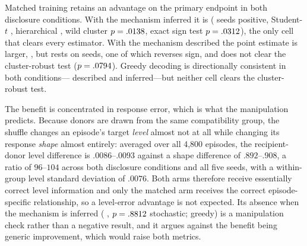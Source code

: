\begin{table}[htbp]
\centering\footnotesize
\setlength{\tabcolsep}{3pt}

\caption{\textbf{Matched training retains a smaller advantage over a
distribution-matched shuffled-target control.} Entries are shuffled-minus-matched
response MAE at \eShufG{} training seeds; positive favors matched training.
The hierarchical interval resamples seeds and trajectories; Webb $p$ is a
two-sided wild cluster bootstrap. The stochastic inferred-mechanism cell is the
pre-registered primary endpoint and the only cell clearing every estimator.}
\label{tab:exp3-shuffled-control}
\end{table}

Matched training retains an advantage on the primary endpoint in both
disclosure conditions. With the mechanism inferred it is
\eShufUndiscStochEst{} (\eShufUndiscStochSign{} seeds positive, Student-$t$
\eShufUndiscStochTci{}, hierarchical \eShufUndiscStochCi{}, wild cluster
$p=.0138{}$, exact sign test $p=.0312{}$),
the only cell that clears every estimator. With the mechanism described the
point estimate is larger, \eShufDiscStochEst{} \eShufDiscStochCi{}, but rests
on \eShufDiscStochSign{} seeds, one of which reverses sign, and does not clear
the cluster-robust test ($p=.0794{}$). Greedy decoding is
directionally consistent in both conditions---\eShufDiscGreedyEst{} described
and \eShufUndiscGreedyEst{} inferred---but neither cell clears the
cluster-robust test.

\begin{table}[htbp]
\centering\footnotesize
\setlength{\tabcolsep}{3pt}

\caption{\textbf{The matched advantage does not appear in level error.}
Shuffled-minus-matched level MAE, same runs and estimators as
Table~\ref{tab:exp3-shuffled-control}. The inferred-mechanism cells show no
matched benefit. This contrast was not pre-registered and is descriptive.}
\label{tab:exp3-shuffled-control-level}
\end{table}

The benefit is concentrated in response error, which is what the manipulation
predicts. Because donors are drawn from the same compatibility group, the
shuffle changes an episode's target \emph{level} almost not at all while
changing its response \emph{shape} almost entirely: averaged over all 4,800
episodes, the recipient-donor level difference is $.0086$--$.0093$ against a
shape difference of $.892$--$.908$, a ratio of $96$--$104$ across both
disclosure conditions and all five seeds, with a within-group level standard
deviation of $.0076$. Both arms therefore receive essentially correct level
information and only the matched arm receives the correct episode-specific
relationship, so a level-error advantage is not expected. Its absence when the
mechanism is inferred (\eShufUndiscStochLevelEst{} \eShufUndiscStochLevelCi{},
$p=.8812{}$ stochastic; \eShufUndiscGreedyLevelEst{}
\eShufUndiscGreedyLevelCi{} greedy) is a manipulation check rather than a
negative result, and it argues against the benefit being generic improvement,
which would raise both metrics.

